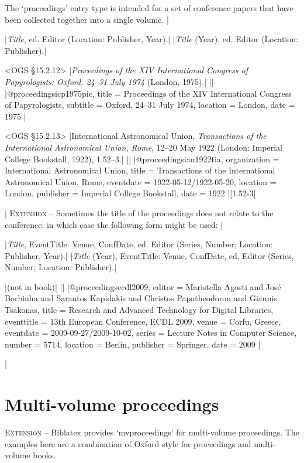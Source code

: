 \documentclass[extrafontsizes,11pt,a4paper,oneside]{memoir}
\newcommand*{\lit}[1]{\textsf{#1}}
\newcommand*{\code}[1]{`\textsf{#1}'}
\begin{document}
The \code{proceedings} entry type is intended for a set of conference papers that have been collected together into a single volume.
|

\specs
|\emph{Title}, \lit{ed.} Editor (Location: Publisher, Year).|%
|\emph{Title} (Year), \lit{ed.} Editor (Location: Publisher).|

\bibexample<OGS \S15.2.12>
|\emph{Proceedings of the XIV International Congress of Papyrologists: Oxford, 24--31 July 1974} (London, 1975).|%
||%
|@proceedings{icp1975pic,
  title = {Proceedings of the {XIV} {International} {Congress} of {Papyrologists}},
  subtitle = {{Oxford}, 24--31 {July} 1974},
  location = {London},
  date = {1975}
}|

\bibexample<OGS \S15.2.13>
|International Astronomical Union, \emph{Transactions of the International Astronomical Union, Rome}, 12--20 May 1922 (London: Imperial College Bookstall, 1922), 1.52–3.|%
||%
|@proceedings{iau1922tia,
  organization = {International Astronomical Union},
  title = {Transactions of the {International} {Astronomical} {Union}, {Rome}},
  eventdate = {1922-05-12/1922-05-20},
  location = {London},
  publisher = {Imperial College Bookstall},
  date = {1922}
}|[1.52-3]

\todoc|
\textsc{Extension} – Sometimes the title of the proceedings does not relate to the conference; in which case the following form might be used:
|

\specs
|\emph{Title}, EventTitle: Venue, ConfDate, \lit{ed.} Editor (Series, Number; Location: Publisher, Year).|%
|\emph{Title} (Year), EventTitle: Venue, ConfDate, \lit{ed.} Editor (Series, Number; Location: Publisher).|

\bibexample
|(not in book)|%
||%
|@proceedings{ecdl2009,
  editor = {Maristella Agosti and José Borbinha and Sarantos Kapidakis and Christos Papatheodorou and Giannis Tsakonas},
  title = {Research and Advanced Technology for Digital Libraries},
  eventtitle = {13th European Conference, ECDL 2009},
  venue = {Corfu, Greece},
  eventdate = {2009-09-27/2009-10-02},
  series = {Lecture Notes in Computer Science},
  number = {5714},
  location = {Berlin},
  publisher = {Springer},
  date = {2009}
}|

\todoc|
\section{Multi-volume proceedings}

\textsc{Extension} – Biblatex provides \code{mvproceedings} for multi-volume proceedings.
The examples here are a combination of Oxford style for proceedings and multi-volume books.
\end{document}
